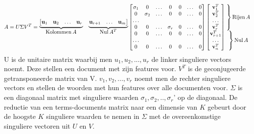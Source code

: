 \[
   A= U\Sigma V^T=
  \begin{matrix}
    \underbrace{\left[\begin{matrix}\vect u_1 & \vect u_2 & \dots & \vect u_r\end{matrix}\right.}& 
    \underbrace{\left.\begin{matrix}\vect u_{r+1} & \dots &  \vect u_m\end{matrix}\right]}\\
    \col A & \nul A^T
  \end{matrix}
  \begin{bmatrix}
      \sigma_1 & 0 & \dots & 0 & 0 & \dots & 0 \\
         0 & \sigma_2  & \dots & 0 & 0 & \dots & 0 \\
         \dots& & & & &  \\
         0 & 0 & \dots & \sigma_r  & 0 & \dots & 0 \\
         0 & 0 & \dots & 0 & 0 & \dots & 0 \\
         \dots& & & & &  \\
         0 & 0 & \dots & 0 & 0 & \dots & 0 
  \end{bmatrix}
  \begin{bmatrix}
    \vect v_1^T \\ \vect v_2^T \\ \dots \\ \vect v_r^T \\
    \vect v_{r+1}^T \\ \dots \\ \vect v_n^T
  \end{bmatrix}
  \begin{matrix}
    \left.\vphantom{\begin{bmatrix}
       \vect v_1^T \\ \vect v_2^T \\ \dots \\ \vect v_r^T 
       \end{bmatrix}}\right\}\row A \\ 
    \left.\vphantom{\begin{bmatrix}
      \vect v_{r+1}^T \\ \dots \\ \vect v_n^T 
    \end{bmatrix}}\right\}\nul A
  \end{matrix}
\] 
\newline
U is de unitaire matrix waarbij men $u_1, u_2, ... , u_r$ de linker singuliere vectors noemt. Deze stellen een document met zijn features voor. $V^T$ is de geconjugeerde getransponeerde matrix van V. $v_1, v_2, ... , v_r$ noemt men de rechter singuliere vectors en stellen de woorden met hun features over alle documenten voor. $\Sigma$ is een diagonaal matrix met singuliere waarden $\sigma_1,\sigma_2,..,\sigma_r$'  op de diagonaal. De reductie van een terms-documents matrix naar een dimensie van $K$ gebeurt door de hoogste $K$ singuliere waarden te nemen in $\Sigma$ met de overeenkomstige singuliere vectoren uit $U$ en $V$.    
